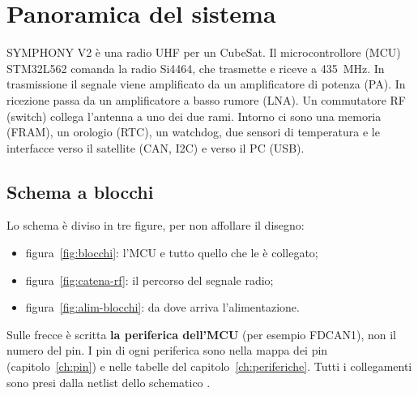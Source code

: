 \chapter{Panoramica del sistema}
\label{ch:sistema}

\begin{semplice}
SYMPHONY V2 è una radio UHF per un CubeSat. Il microcontrollore (MCU) STM32L562 comanda la radio Si4464, che trasmette e riceve a \SI{435}{\mega\hertz}. In trasmissione il segnale viene amplificato da un amplificatore di potenza (PA). In ricezione passa da un amplificatore a basso rumore (LNA). Un commutatore RF (switch) collega l'antenna a uno dei due rami. Intorno ci sono una memoria (FRAM), un orologio (RTC), un watchdog, due sensori di temperatura e le interfacce verso il satellite (CAN, I2C) e verso il PC (USB).
\end{semplice}

\section{Schema a blocchi}
Lo schema è diviso in tre figure, per non affollare il disegno:
\begin{itemize}
\item figura~\ref{fig:blocchi}: l'MCU e tutto quello che le è collegato;
\item figura~\ref{fig:catena-rf}: il percorso del segnale radio;
\item figura~\ref{fig:alim-blocchi}: da dove arriva l'alimentazione.
\end{itemize}
Sulle frecce è scritta \textbf{la periferica dell'MCU} (per esempio FDCAN1), non il numero del pin. I pin di ogni periferica sono nella mappa dei pin (capitolo~\ref{ch:pin}) e nelle tabelle del capitolo~\ref{ch:periferiche}. Tutti i collegamenti sono presi dalla netlist dello schematico .

